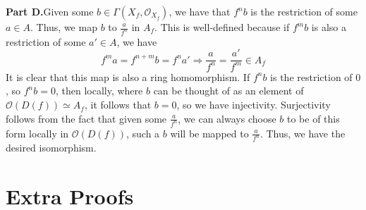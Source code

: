 \documentclass[aps,pra,showpacs,notitlepage,onecolumn,superscriptaddress,nofootinbib]{revtex4-1}
\theoremstyle{definition}
\begin{document}
 \noindent \textbf{Part D.}Given some $b \in \Gamma(X_f, \mathcal{O}_{X_f})$, we have that $f^n b$ is the restriction of some $a \in A$. Thus, we map $b$ to $\frac{a}{f^n}$ in $A_f$.
            This is well-defined because if $f^m b$ is also a restriction of some $a' \in A$, we have
            \begin{equation}
              f^m a = f^{n + m} b = f^n a' \Longrightarrow \frac{a}{f^n} = \frac{a'}{f^m} \in A_f
              \end{equation}
            It is clear that this map is also a ring homomorphism. If $f^n b$ is the restriction of $0$, so $f^n b = 0$, then locally, where $b$ can be thought of as an element of $\mathcal{O}(D(f)) \simeq A_f$,
            it follows that $b = 0$, so we have injectivity. Surjectivity follows from the fact that given some $\frac{a}{f^n}$, we can always choose $b$ to be of this form locally in $\mathcal{O}(D(f))$, such a $b$ will be mapped
            to $\frac{a}{f^n}$. Thus, we have the desired isomorphism.

\section{Extra Proofs}
\label{sec:extra}
\end{document}
